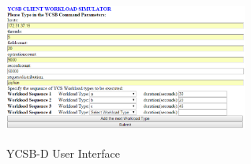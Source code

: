 \documentclass{vldb}
\begin{document}

\begin{figure}[!htpb]%
       \centering%
        \includegraphics[width=8cm,height=5cm]
{ClientInput.eps}
                \caption{YCSB-D User Interface}%
\label{fig:input}%
        \end{figure}%
\end{document}

